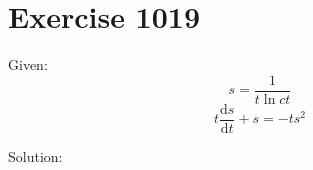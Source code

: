 \documentclass[a4paper, 10pt]{scrartcl}
\newcommand*\d{\mathrm{d}}
\begin{document}
\section{Exercise 1019}

Given:
\[
s = \frac{1}{t\ln{ct}}
\]
\[
t\frac{\d s}{\d t} + s = -ts^{2}
\]

Solution:
\end{document}

